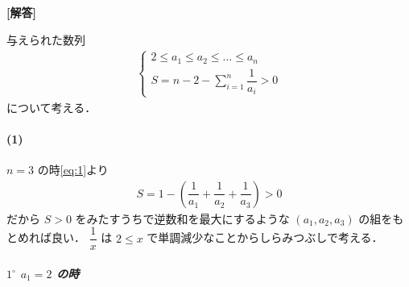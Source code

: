 \documentclass[../../main.tex]{subfiles}
\begin{document}
\begin{oframed}
  
\end{oframed}

{\bf [解答]}

与えられた数列
\begin{align}
  \begin{cases}
    2 \le a_1 \le a_2 \le \dots \le a_n  \\
    S = n-2 - \displaystyle\sum_{i=1}^n \dfrac{1}{a_i} > 0
  \end{cases} \label{eq:1}
\end{align}
について考える．

\paragraph{(1)}

$n=3$ の時\cref{eq:1}より
\begin{align}
  S = 1 - \left( \dfrac{1}{a_1} + \dfrac{1}{a_2} + \dfrac{1}{a_3} \right) > 0 \label{eq:2}
\end{align}
だから $S > 0$ をみたすうちで逆数和を最大にするような $(a_1,a_2,a_3)$ の組をもとめれば良い．
$\dfrac{1}{x}$ は $2 \le x$ で単調減少なことからしらみつぶしで考える．

\subparagraph{$1^\circ$ $a_1 = 2$ の時}
\end{document}
